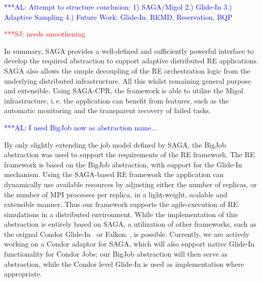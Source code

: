 \documentclass{rspublic}
\newcommand{\alnote}[1]{ {\textcolor{blue} { ***AL: #1 }}}
\newcommand{\jhanote}[1]{ {\textcolor{red} { ***SJ: #1 }}}
\newcommand{\alnote}[1]{}
\newcommand{\jhanote}[1]{}
\begin{document}


                    
\alnote{Attempt to structure conclusion: 1) SAGA/Migol 2.) Glide-In
  3.) Adaptive Sampling 4.) Future Work: Glide-In, REMD, Reservation,
  BQP}
                                         
\jhanote{needs smoothening} 

In summary, SAGA provides a well-defined and sufficiently powerful
interface to develop the required abstraction to support adaptive
distributed RE applications.  SAGA also allows the simple decoupling
of the RE orchestration logic from the underlying distributed
infrastructure. All this whilst remaining general purpose and
extensible.  Using SAGA-CPR, the framework is able to utilise the
Migol infrastructure, i.\,e. the application can benefit from
features, such as the automatic monitoring and the transparent
recovery of failed tasks.

\alnote{I used BigJob now as abstraction name...}  

By only slightly extending the job model defined by SAGA, the BigJob
abstraction was used to support the requirements of the RE
framework.
The RE framework is based on the BigJob abstraction, with support for
the Glide-In mechanism. Using the SAGA-based RE framework the
application can dynamically use available resources by adjusting
either the number of replicas, or the number of MPI processes per
replica, in a light-weight, scalable and extensible manner.  Thus our
framework supports the agile-execution of RE simulations in a
distributed environment.
While the implementation of this abstraction is entirely based on
SAGA, a utilization of other frameworks, such as the orignal Condor
Glide-In~\citep{citeulike:291860} or Falkon~\citep{1362680}, is
possible. Currently, we are actively working on a Condor adaptor for
SAGA, which will also support native Glide-In functionality for Condor
Jobs; our BigJob abstraction will then serve as abstraction, while the
Condor level Glide-In is used as implementation where appropriate.
\end{document}
